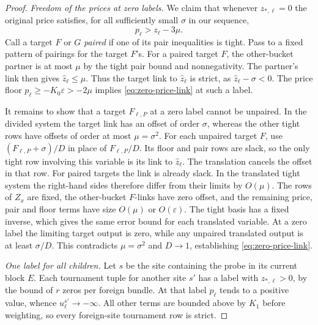 \begin{proof}
\smallskip
\noindent\emph{Freedom of the prices at zero labels.}
We claim that whenever $z_{*,\ell}=0$ the original price satisfies, for all sufficiently small $\sigma$ in our sequence,
\begin{equation}\label{eq:zero-price-link}
                  p_\ell>z_\ell-3\mu .
\end{equation}
Call a target $F$ or $G$ \emph{paired} if one of its pair inequalities
is tight. Pass to a fixed pattern of pairings for the target $F$'s.
For a paired target $F$, the other-bucket partner is at most $\mu$
by the tight pair bound and nonnegativity. The partner's link then gives
$\widehat z_\ell\le\mu$. Thus the target link to $\widehat z_\ell$ is
strict, as $\widehat z_\ell-\sigma<0$. The price floor
$p_\ell\ge-K_0\varepsilon>-2\mu$ implies
\eqref{eq:zero-price-link} at such a label.

It remains to show that a target \(F_{\ell,P}\) at a zero label
cannot be unpaired. In the divided system the target link has an
offset of order \(\sigma\), whereas the other tight rows have offsets
of order at most \(\mu=\sigma^2\). For each unpaired target \(F\),
use \((F_{\ell,P}+\sigma)/D\) in place of \(F_{\ell,P}/D\).
Its floor and pair rows are slack, so the only tight row involving
this variable is its link to \(\widehat z_\ell\). The translation
cancels the offset in that row. For paired targets the link is already
slack. In the translated tight system the right-hand sides therefore differ
from their limits by \(O(\mu)\). The rows of \(Z_x\) are fixed,
the other-bucket \(F\)-links have zero offset, and the remaining price,
pair and floor terms have size \(O(\mu)\) or \(O(\varepsilon)\).
The tight basis has a fixed inverse, which gives the same error bound
for each translated variable. At a zero label the limiting
target output is zero, while any unpaired translated output is at least
$\sigma/D$. This contradicts $\mu=\sigma^2$ and $D\to1$,
establishing \eqref{eq:zero-price-link}.

\smallskip
\noindent\emph{One label for all children.}
Let $s$ be the site containing the probe in its current block $E$.
Each tournament tuple for another site $s'$ has a label with
$z_{*,\ell}>0$, by the bound of $r$ zeros per foreign bundle. At
that label $p_\ell$ tends to a positive value, whence
$u_\ell^{s'}\to-\infty$. All other terms are bounded above by $K_1$
before weighting, so every foreign-site tournament row is strict.


\end{proof}
